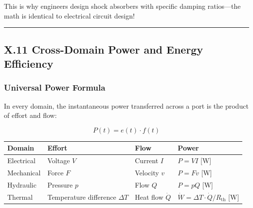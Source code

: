 \documentclass[
]{article}
\begin{document}
This is why engineers design shock absorbers with specific damping
ratios---the math is identical to electrical circuit design!

\begin{center}\rule{0.5\linewidth}{0.5pt}\end{center}

\subsection{X.11 Cross-Domain Power and Energy
Efficiency}\label{x.11-cross-domain-power-and-energy-efficiency}

\subsubsection{Universal Power Formula}\label{universal-power-formula}

In every domain, the instantaneous power transferred across a port is
the product of effort and flow:

\[P(t) = e(t) \cdot f(t)\]

\begin{longtable}[]{@{}
  >{\raggedright\arraybackslash}p{}
  >{\raggedright\arraybackslash}p{}
  >{\raggedright\arraybackslash}p{}
  >{\raggedright\arraybackslash}p{}@{}}
\toprule\noalign{}
\begin{minipage}[b]{\linewidth}\raggedright
Domain
\end{minipage} & \begin{minipage}[b]{\linewidth}\raggedright
Effort
\end{minipage} & \begin{minipage}[b]{\linewidth}\raggedright
Flow
\end{minipage} & \begin{minipage}[b]{\linewidth}\raggedright
Power
\end{minipage} \\
\midrule\noalign{}
\endhead
\bottomrule\noalign{}
\endlastfoot
Electrical & Voltage \(V\) & Current \(I\) & \(P = VI\) {[}W{]} \\
Mechanical & Force \(F\) & Velocity \(v\) & \(P = Fv\) {[}W{]} \\
Hydraulic & Pressure \(p\) & Flow \(Q\) & \(P = pQ\) {[}W{]} \\
Thermal & Temperature difference \(\Delta T\) & Heat flow \(\dot{Q}\) &
\(\dot{W} = \Delta T \cdot \dot{Q} / R_{\text{th}}\) {[}W{]} \\
\end{longtable}
\end{document}
